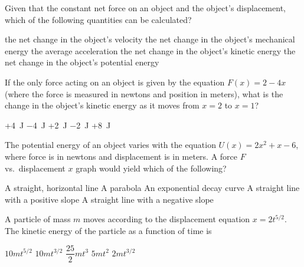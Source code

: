 \documentclass{../../oss-apphys-exam}
\begin{document}
\begin{multicols*}{2}
\begin{questions}
    \question Given that the constant net force on an object and the object's 
    displacement, which of the following quantities can be calculated?
    \begin{choices}
      \choice the net change in the object's velocity
      \choice the net change in the object's mechanical energy
      \choice the average acceleration
      \choice the net change in the object's kinetic energy
      \choice the net change in the object's potential energy
    \end{choices}
    
    
    \question If the only force acting on an object is given by the equation
    $F(x)=2-4x$ (where the force is measured in newtons and position in meters),
    what is the change in the object's kinetic energy as it moves from $x=2$ to
    $x=1$?
    \begin{choices}
      \choice +\SI{4}{\joule}
      \choice \SI{-4}{\joule}
      \choice +\SI{2}{\joule}
      \choice \SI{-2}{\joule}
      \choice +\SI{8}{\joule}
    \end{choices}
    
    \question The potential energy of an object varies with the equation
    $U(x)=2x^2+x-6$, where force is in newtons and displacement is in meters. A
    force $F$ vs.\ displacement $x$ graph would yield which of the following?
    \begin{choices}
      \choice A straight, horizontal line
      \choice A parabola
      \choice An exponential decay curve
      \choice A straight line with a positive slope
      \choice A straight line with a negative slope
    \end{choices}
    \columnbreak
    
    \question A particle of mass $m$ moves according to the displacement
    equation $x=2t^{5/2}$. The kinetic energy of the particle as a function of
    time is
    \begin{choices}
      \choice $10mt^{5/2}$
      \choice $10mt^{3/2}$
      \choice $\dfrac{25}2mt^3$
      \choice $5mt^2$
      \choice $2mt^{3/2}$
    \end{choices}
    

\end{questions}
\end{multicols*}
\end{document}
